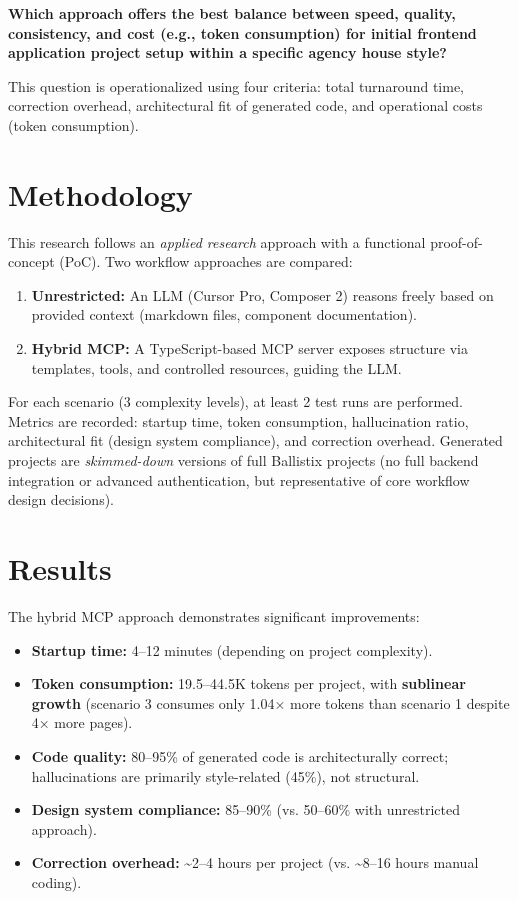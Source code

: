 \textbf{Which approach offers the best balance between speed, quality, consistency, and cost (e.g., token consumption) for initial frontend application project setup within a specific agency house style?}

This question is operationalized using four criteria: total turnaround time, correction overhead, architectural fit of generated code, and operational costs (token consumption).

\section*{Methodology}

This research follows an \textit{applied research} approach with a functional proof-of-concept (PoC). Two workflow approaches are compared:

\begin{enumerate}
  \item \textbf{Unrestricted:} An LLM (Cursor Pro, Composer 2) reasons freely based on provided context (markdown files, component documentation).
  
  \item \textbf{Hybrid MCP:} A TypeScript-based MCP server exposes structure via templates, tools, and controlled resources, guiding the LLM.
\end{enumerate}

For each scenario (3 complexity levels), at least 2 test runs are performed. Metrics are recorded: startup time, token consumption, hallucination ratio, architectural fit (design system compliance), and correction overhead. Generated projects are \textit{skimmed-down} versions of full Ballistix projects (no full backend integration or advanced authentication, but representative of core workflow design decisions).

\section*{Results}

The hybrid MCP approach demonstrates significant improvements:

\begin{itemize}
  \item \textbf{Startup time:} 4--12 minutes (depending on project complexity).
  
  \item \textbf{Token consumption:} 19.5--44.5K tokens per project, with \textbf{sublinear growth} (scenario 3 consumes only 1.04× more tokens than scenario 1 despite 4× more pages).
  
  \item \textbf{Code quality:} 80--95\% of generated code is architecturally correct; hallucinations are primarily style-related (45\%), not structural.
  
  \item \textbf{Design system compliance:} 85--90\% (vs. 50--60\% with unrestricted approach).
  
  \item \textbf{Correction overhead:} \textasciitilde 2--4 hours per project (vs. \textasciitilde 8--16 hours manual coding).
\end{itemize}

